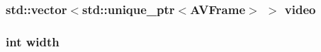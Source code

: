 \subsubsection[{video}]{\setlength{\rightskip}{0pt plus 5cm}std\+::vector$<$std\+::unique\+\_\+ptr$<$A\+V\+Frame$>$ $>$ video\hspace{0.3cm}{\ttfamily [private]}}\label{classModel_1_1AVVideo_a601870b0122737f8ee0b0b094944d2ae}
\hypertarget{classModel_1_1AVVideo_a2474a5474cbff19523a51eb1de01cda4}{}
\subsubsection[{width}]{\setlength{\rightskip}{0pt plus 5cm}int width\hspace{0.3cm}{\ttfamily [private]}}\label{classModel_1_1AVVideo_a2474a5474cbff19523a51eb1de01cda4}
